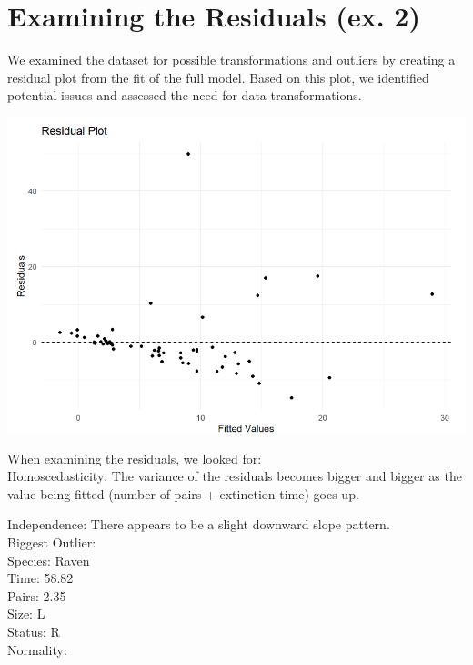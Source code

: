 \documentclass{article}
\begin{document}
\section{Examining the Residuals (ex. 2)}

We examined the dataset for possible transformations and outliers by creating a residual plot from the fit of the full model. Based on this plot, we identified potential issues and assessed the need for data transformations.

\begin{center}
\includegraphics[scale=0.5]{graphs/residual.png}
\end{center}


When examining the residuals, we looked for: \\

Homoscedasticity: The variance of the residuals becomes bigger and bigger as the value
being fitted (number of pairs + extinction time) goes up.

Independence: There appears to be a slight downward slope pattern. \\

Biggest Outlier: \\
Species: Raven \\
Time: 58.82 \\
Pairs: 2.35 \\
Size: L \\
Status: R \\

Normality:
\end{document}
